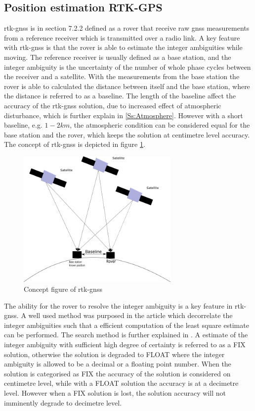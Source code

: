 \subsection{Position estimation RTK-GPS}\label{ss:rtk-gps}
\acrfull{rtk-gnss} is in \citep{misra2011global} section 7.2.2 defined as a rover that receive raw \gls{gnss} measurements from a reference receiver which is transmitted over a radio link. A key feature with \gls{rtk-gnss} is that the rover is able to estimate the integer ambiguities while moving. The reference receiver is usually defined as a base station, and the integer ambiguity is the uncertainty of the number of whole phase cycles between the receiver and a satellite. With the measurements from the base station the rover is able to calculated the distance between itself and the base station, where the distance is referred to as a baseline. The length of the baseline affect the accuracy of the \gls{rtk-gnss} solution, due to increased effect of atmospheric disturbance, which is further explain in \ref{Ss:Atmosphere}. However with a short baseline, e.g. $1-2 km$, the atmospheric condition can be considered equal for the base station and the rover, which keeps the solution  at centimetre level accuracy. The concept of \gls{rtk-gnss} is depicted in figure \ref{figure:RTK}.
\begin{figure}[H]
	\centering
		\includegraphics[width=0.7\textwidth]{figs/DGPS.png}
		\caption{Concept figure of \acrfull{rtk-gnss}}
		\label{figure:RTK}
\end{figure}
The ability for the rover to resolve the integer ambiguity is a key feature in \gls{rtk-gnss}. A well used method was purposed in the article \citep{teunissen1994new} which decorrelate the integer ambiguities such that a efficient computation of the least square estimate can be performed. The search method is further explained in \citep{teunissen1995least}. A estimate of the integer ambiguity with sufficient high degree of certainty is referred to as a FIX solution, otherwise the solution is degraded to FLOAT where the integer ambiguity is allowed to be a decimal or a floating point number. When the solution is categorised as FIX the accuracy of the solution is considered on centimetre level, while with a FLOAT solution the accuracy is at a decimetre level. However when a FIX solution is lost, the solution accuracy will not imminently degrade to decimetre level.

